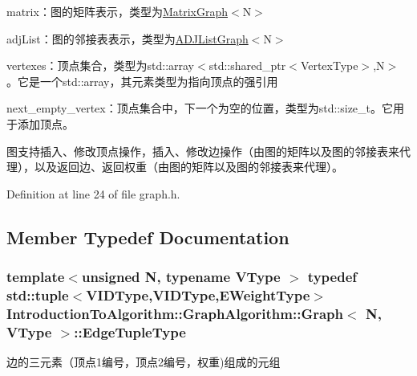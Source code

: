 \begin{DoxyItemize}
\item {\ttfamily matrix}：图的矩阵表示，类型为{\ttfamily \hyperlink{struct_introduction_to_algorithm_1_1_graph_algorithm_1_1_matrix_graph}{Matrix\+Graph}$<$N$>$}
\item {\ttfamily adj\+List}：图的邻接表表示，类型为{\ttfamily \hyperlink{struct_introduction_to_algorithm_1_1_graph_algorithm_1_1_a_d_j_list_graph}{A\+D\+J\+List\+Graph}$<$N$>$}
\item {\ttfamily vertexes}：顶点集合，类型为{\ttfamily std\+::array$<$std\+::shared\+\_\+ptr$<$Vertex\+Type$>$,N$>$}。它是一个{\ttfamily std\+::array}，其元素类型为指向顶点的强引用
\item {\ttfamily next\+\_\+empty\+\_\+vertex}：顶点集合中，下一个为空的位置，类型为{\ttfamily std\+::size\+\_\+t}。它用于添加顶点。
\end{DoxyItemize}

图支持插入、修改顶点操作，插入、修改边操作（由图的矩阵以及图的邻接表来代理），以及返回边、返回权重（由图的矩阵以及图的邻接表来代理）。 

Definition at line 24 of file graph.\+h.



\subsection{Member Typedef Documentation}
\hypertarget{struct_introduction_to_algorithm_1_1_graph_algorithm_1_1_graph_ad1eb485d135eb8076a44b00904ae2f5a}{}
\subsubsection[{Edge\+Tuple\+Type}]{\setlength{\rightskip}{0pt plus 5cm}template$<$unsigned N, typename V\+Type $>$ typedef std\+::tuple$<${\bf V\+I\+D\+Type},{\bf V\+I\+D\+Type},{\bf E\+Weight\+Type}$>$ {\bf Introduction\+To\+Algorithm\+::\+Graph\+Algorithm\+::\+Graph}$<$ N, V\+Type $>$\+::{\bf Edge\+Tuple\+Type}}\label{struct_introduction_to_algorithm_1_1_graph_algorithm_1_1_graph_ad1eb485d135eb8076a44b00904ae2f5a}
边的三元素（顶点1编号，顶点2编号，权重)组成的元组 

